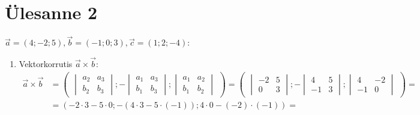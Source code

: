 \documentclass[10pt, a4paper]{article}
\begin{document}
    \section{Ülesanne 2}
        $\vec{a} = (4; -2; 5), \vec{b} = (-1; 0; 3), \vec{c} = (1; 2; -4)$:
        \begin{enumerate}
            \item Vektorkorrutis $\vec{a} \times \vec{b}$:
                \begin{align}
                    \nonumber
                    \vec{a} \times \vec{b} &= 
                    \begin{pmatrix}
                        \begin{vmatrix}
                            a_2 & a_3 \\
                            b_2 & b_3
                        \end{vmatrix};
                        -\begin{vmatrix}
                            a_1 & a_3 \\
                            b_1 & b_3
                        \end{vmatrix};
                        \begin{vmatrix}
                            a_1 & a_2 \\
                            b_1 & b_2
                        \end{vmatrix}
                    \end{pmatrix}
                    = \begin{pmatrix}
                        \begin{vmatrix}
                            -2 & 5 \\
                            0 & 3
                        \end{vmatrix};
                        -\begin{vmatrix}
                            4 & 5 \\
                            -1 & 3
                        \end{vmatrix};
                        \begin{vmatrix}
                            4 & -2 \\
                            -1 & 0
                        \end{vmatrix}
                    \end{pmatrix} = \\ \nonumber
                    &=(-2 \cdot 3 - 5 \cdot 0; -(4 \cdot 3 - 5 \cdot (-1)); 4 \cdot 0 - (-2) \cdot (-1)) = \\ \nonumber

\end{align}
\end{enumerate}
\end{document}
